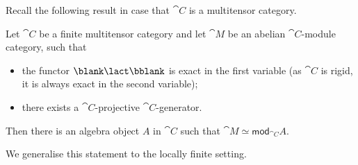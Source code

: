Recall the following result in case that \(\cat{C}\) is a multitensor category.

\begin{theorem}
  Let \(\cat{C}\) be a finite multitensor category
  and let \(\cat{M}\) be an abelian \(\cat{C}\)\hyp{}module category, such that
  \begin{itemize}
    \item the functor \(\blank \lact \bblank\) is exact in the first variable
    (as \(\cat{C}\) is rigid, it is always exact in the second variable);
    \item there exists a \(\cat{C}\)\hyp{}projective \(\cat{C}\)\hyp{}generator.
  \end{itemize}
  Then there is an algebra object \(A\) in \(\cat{C}\) such that \(\cat{M} \simeq \mathsf{mod}_{\cat{C}}A\).
\end{theorem}

We generalise this statement to the locally finite setting.


